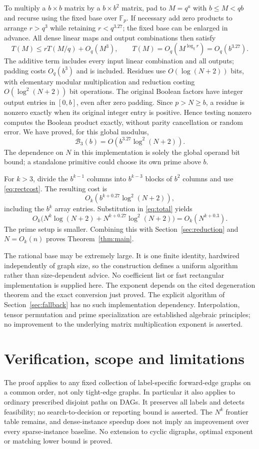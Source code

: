 \documentclass[acmlarge,11pt,screen,nonacm]{acmart}
\newcommand{\Fp}{\mathbb F_p}
\begin{document}
To multiply a $b\times b$ matrix by a $b\times b^2$ matrix, pad to
$M=q^a$ with $b\leq M<qb$ and recurse using the fixed base over $\Fp$.
If necessary add zero products to arrange $r>q^3$ while retaining
$r<q^{3.27}$; the fixed base can be enlarged in advance. All dense linear
maps and output combinations then satisfy
\[
 T(M)\leq rT(M/q)+O_q(M^3),\qquad
 T(M)=O_q(M^{\log_q r})=O_q(b^{3.27}).
\]
The additive term includes every input linear combination and all outputs;
padding costs $O_q(b^3)$ and is included. Residues use
$O(\log(N+2))$ bits, with elementary modular multiplication and reduction
costing $O(\log^2(N+2))$ bit operations. The original Boolean factors have
integer output entries in $[0,b]$, even after zero padding. Since
$p>N\geq b$, a residue is nonzero exactly when its original integer entry
is positive. Hence testing nonzero computes the Boolean product exactly,
without parity cancellation or random error. We have proved, for this
global modulus,
\begin{equation}\label{eq:rectcost}
 \mathcal B_3(b)=O(b^{3.27}\log^2(N+2)).
\end{equation}
The dependence on $N$ in this implementation is solely the global operand
bit bound; a standalone primitive could choose its own prime above $b$.

For $k>3$, divide the $b^{k-1}$ columns into $b^{k-3}$ blocks of $b^2$
columns and use \eqref{eq:rectcost}. The resulting cost is
\[
O_k(b^{k+0.27}\log^2(N+2)),
\]
including the $b^k$ array entries. Substitution
in \eqref{eq:total} yields
\[
 O_k\bigl(N^k\log(N+2)+N^{k+0.27}\log^2(N+2)\bigr)
 =O_k(N^{k+0.3}).
\]
The prime setup is smaller. Combining this with Section~\ref{sec:reduction}
and $N=O_k(n)$ proves Theorem~\ref{thm:main}.

The rational base may be extremely large. It is one finite identity,
hardwired independently of graph size, so the construction defines a uniform
algorithm rather than size-dependent advice. No coefficient list or fast
rectangular implementation is supplied here. The exponent depends on the
cited degeneration theorem and the exact conversion just proved. The
explicit algorithm of Section~\ref{sec:fallback} has no such implementation
dependency. Interpolation, tensor permutation and prime specialization are
established algebraic principles; no improvement to the underlying matrix
multiplication exponent is asserted.

\section{Verification, scope and limitations}\label{sec:limits}
The proof applies to any fixed collection of label-specific forward-edge
graphs on a common order, not only tight-edge graphs. In particular it also
applies to ordinary prescribed disjoint paths on DAGs. It preserves all
labels and detects feasibility; no search-to-decision or reporting bound
is asserted. The $N^k$ frontier table remains, and dense-instance speedup
does not imply an improvement over every sparse-instance baseline. No
extension to cyclic digraphs, optimal exponent or matching lower bound is
proved.
\end{document}
